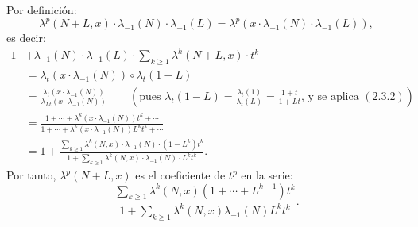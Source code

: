 Por definición:
\[
  \lambda^p(N+L,x)\cdot\lambda_{-1}(N)\cdot\lambda_{-1}(L)
  =\lambda^p(x\cdot\lambda_{-1}(N)\cdot\lambda_{-1}(L)),
\]
es decir:
\[
\begin{aligned}
1&+\lambda_{-1}(N)\cdot\lambda_{-1}(L)\cdot\sum_{k\ge1}\lambda^k(N+L,x)\cdot t^k \\
 &=\lambda_t(x\cdot\lambda_{-1}(N))\circ \lambda_t(1-L) \\
 &=\frac{\lambda_t(x\cdot\lambda_{-1}(N))}{\lambda_{Lt}(x\cdot\lambda_{-1}(N))}
   \qquad\left(\text{pues }\lambda_t(1-L)=\frac{\lambda_t(1)}{\lambda_t(L)}=\frac{1+t}{1+Lt}\text{, y se aplica }(2.3.2)\right) \\
 &=\frac{1+\cdots+\lambda^k(x\cdot\lambda_{-1}(N))t^k+\cdots}{1+\cdots+\lambda^k(x\cdot\lambda_{-1}(N))L^k t^k+\cdots} \\
 &=1+\frac{\sum_{k\ge1}\lambda^k(N,x)\cdot\lambda_{-1}(N)\cdot(1-L^k)t^k}{1+\sum_{k\ge1}\lambda^k(N,x)\cdot\lambda_{-1}(N)\cdot L^k t^k}.
\end{aligned}
\]
Por tanto, \(\lambda^p(N+L,x)\) es el coeficiente de \(t^p\) en la serie:
\[
  \frac{\displaystyle\sum_{k\ge1}\lambda^k(N,x)
        (1+\cdots+L^{k-1})t^k}
       {\displaystyle 1+\sum_{k\ge1}\lambda^k(N,x)
        \lambda_{-1}(N)L^k t^k}.
\]
